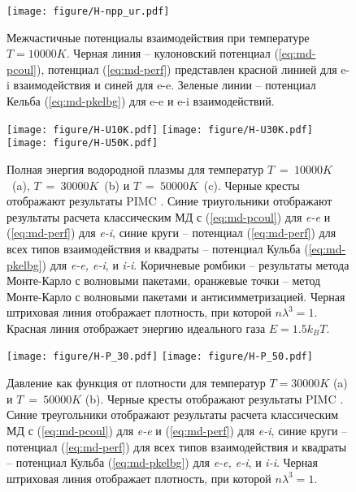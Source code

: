 \begin{figure}	
	\centering
	\texttt{[image: figure/H-npp\_ur.pdf]}
	\caption{\label{fig:eos-potential}Межчастичные потенциалы взаимодействия при температуре $T=10000K$. Черная линия -- кулоновский потенциал (\ref{eq:md-pcoul}),
		потенциал (\ref{eq:md-perf}) представлен красной линией для e-i взаимодействия и синей для e-e. Зеленые линии -- потенциал Кельба (\ref{eq:md-pkelbg}) для  e-e и e-i взаимодействий.}
\end{figure}

\begin{figure}[t]
	\begin{multicols}{3}
		\centering
		\texttt{[image: figure/H-U10K.pdf]} \columnbreak
		\centering
		\texttt{[image: figure/H-U30K.pdf]} \columnbreak
		\centering
		\texttt{[image: figure/H-U50K.pdf]} 
	\end{multicols}
	\caption{\label{fig:eos-ut}Полная энергия водородной плазмы для температур $T~=~10000K$~(a),
		$T~=~30000K$~(b) и $T~=~50000K$~(c). Черные кресты отображают результаты PIMC \cite{filinov2004thermodynamic}.
		Синие триугольники отображают результаты расчета классическим МД с (\ref{eq:md-pcoul}) для \textit{e-e}
		и (\ref{eq:md-perf}) для \textit{e-i}, синие круги -- потенциал (\ref{eq:md-perf}) для всех типов взаимодействия и квадраты -- потенциал Кульба (\ref{eq:md-pkelbg}) для \textit{e-e, e-i}, и \textit{i-i}.   Коричневые ромбики -- результаты метода Монте-Карло с волновыми пакетами, оранжевые точки -- метод Монте-Карло с волновыми пакетами и антисимметризацией. Черная штриховая линия отображает плотность, при которой $n\lambda^3=1$. Красная линия отображает энергию идеального газа $E = 1.5 k_B T$.
	}
\end{figure}

\begin{figure}[t]
	\centering	
	\begin{multicols}{2}
		\centering
		\texttt{[image: figure/H-P\_30.pdf]} \columnbreak
		\centering
		\texttt{[image: figure/H-P\_50.pdf]}
	\end{multicols}
	\caption{\label{fig:eos-pt}Давление как функция от плотности для температур $T = 30000K$ (a) и $T~=~50000K$ (b).  Черные кресты отображают результаты PIMC \cite{filinov2004thermodynamic}.
		Синие треугольники отображают результаты расчета классическим МД с (\ref{eq:md-pcoul}) для \textit{e-e}
		и (\ref{eq:md-perf}) для \textit{e-i}, синие круги -- потенциал (\ref{eq:md-perf}) для всех типов взаимодействия и квадраты -- потенциал Кульба (\ref{eq:md-pkelbg}) для \textit{e-e, e-i}, и \textit{i-i}.  Черная штриховая линия отображает плотность, при которой $n\lambda^3=1$.}
\end{figure}

